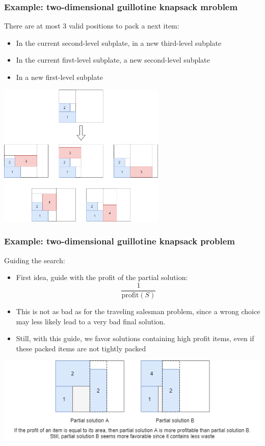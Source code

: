 \documentclass[10pt]{beamer}
\begin{document}
\begin{frame}
  \frametitle{Example: two-dimensional guillotine knapsack mroblem}

  There are at most 3 valid positions to pack a next item:
  \begin{itemize}
    \item In the current second-level subplate, in a new third-level subplate
    \item In the current first-level subplate, a new second-level subplate
    \item In a new first-level subplate
  \end{itemize}

  \begin{center}
    \includegraphics[width=0.6\textwidth]{img/branching_scheme_guillotine.png}
  \end{center}
\end{frame}

\begin{frame}
  \frametitle{Example: two-dimensional guillotine knapsack problem}

  Guiding the search:
  \begin{itemize}
    \item First idea, guide with the profit of the partial solution:
      \begin{displaymath}
        \frac{1}{\mathrm{profit}(S)}
      \end{displaymath}
    \item This is not as bad as for the traveling salesman problem, since a wrong choice may less likely lead to a very bad final solution.
    \item Still, with this guide, we favor solutions containing high profit items, even if these packed items are not tightly packed
  \end{itemize}
  
  \begin{center}
    \includegraphics[width=\textwidth]{img/guillotine_guide_profit.png}
  \end{center}

\end{frame}
\end{document}
